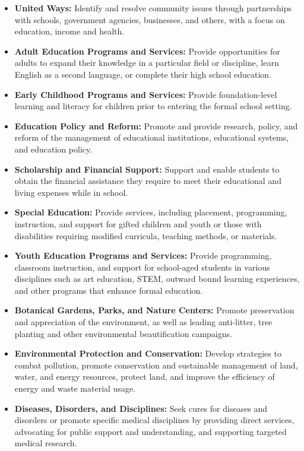 \begin{itemize}[leftmargin=*]
    \item \textbf{United Ways:} Identify and resolve community issues through partnerships with schools, government agencies, businesses, and others, with a focus on education, income and health.
    \item \textbf{Adult Education Programs and Services:} Provide opportunities for adults to expand their knowledge in a particular field or discipline, learn English as a second language, or complete their high school education.
    \item \textbf{Early Childhood Programs and Services:} Provide foundation-level learning and literacy for children prior to entering the formal school setting.
    \item \textbf{Education Policy and Reform:} Promote and provide research, policy, and reform of the management of educational institutions, educational systems, and education policy.
    \item \textbf{Scholarship and Financial Support:} Support and enable students to obtain the financial assistance they require to meet their educational and living expenses while in school.
    \item \textbf{Special Education:} Provide services, including placement, programming, instruction, and support for gifted children and youth or those with disabilities requiring modified curricula, teaching methods, or materials.
    \item \textbf{Youth Education Programs and Services:} Provide programming, classroom instruction, and support for school-aged students in various disciplines such as art education, STEM, outward bound learning experiences, and other programs that enhance formal education.
    \item \textbf{Botanical Gardens, Parks, and Nature Centers:} Promote preservation and appreciation of the environment, as well as leading anti-litter, tree planting and other environmental beautification campaigns.
    \item \textbf{Environmental Protection and Conservation:} Develop strategies to combat pollution, promote conservation and sustainable management of land, water, and energy resources, protect land, and improve the efficiency of energy and waste material usage.
    \item \textbf{Diseases, Disorders, and Disciplines:} Seek cures for diseases and disorders or promote specific medical disciplines by providing direct services, advocating for public support and understanding, and supporting targeted medical research.

\end{itemize}
